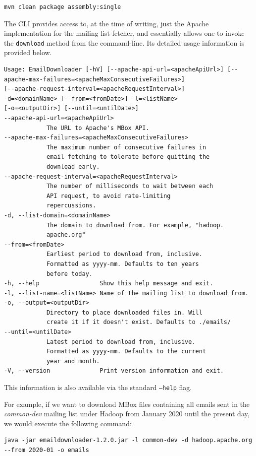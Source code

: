 \documentclass[a4paper, 12pt]{article}
\begin{document}
			\begin{verbatim}
mvn clean package assembly:single
			\end{verbatim}
		
			The CLI provides access to, at the time of writing, just the Apache implementation for the mailing list fetcher, and essentially allows one to invoke the \texttt{download} method from the command-line. Its detailed usage information is provided below.
			
			\begin{verbatim}
Usage: EmailDownloader [-hV] [--apache-api-url=<apacheApiUrl>] [--apache-max-failures=<apacheMaxConsecutiveFailures>]
[--apache-request-interval=<apacheRequestInterval>]
-d=<domainName> [--from=<fromDate>] -l=<listName>
[-o=<outputDir>] [--until=<untilDate>]
--apache-api-url=<apacheApiUrl>
			The URL to Apache's MBox API.
--apache-max-failures=<apacheMaxConsecutiveFailures>
			The maximum number of consecutive failures in
			email fetching to tolerate before quitting the
			download early.
--apache-request-interval=<apacheRequestInterval>
			The number of milliseconds to wait between each
			API request, to avoid rate-limiting
			repercussions.
-d, --list-domain=<domainName>
			The domain to download from. For example, "hadoop.
			apache.org"
--from=<fromDate>
			Earliest period to download from, inclusive.
			Formatted as yyyy-mm. Defaults to ten years
			before today.
-h, --help                 Show this help message and exit.
-l, --list-name=<listName> Name of the mailing list to download from.
-o, --output=<outputDir>
			Directory to place downloaded files in. Will
			create it if it doesn't exist. Defaults to ./emails/
--until=<untilDate>
			Latest period to download from, inclusive.
			Formatted as yyyy-mm. Defaults to the current
			year and month.
-V, --version              Print version information and exit.
			\end{verbatim}
		
			This information is also available via the standard \texttt{--help} flag.
			
			For example, if we want to download MBox files containing all emails sent in the \textit{common-dev} mailing list under Hadoop from January 2020 until the present day, we would execute the following command:
			
			\begin{verbatim}
java -jar emaildownloader-1.2.0.jar -l common-dev -d hadoop.apache.org --from 2020-01 -o emails
			\end{verbatim}
	
\end{document}
